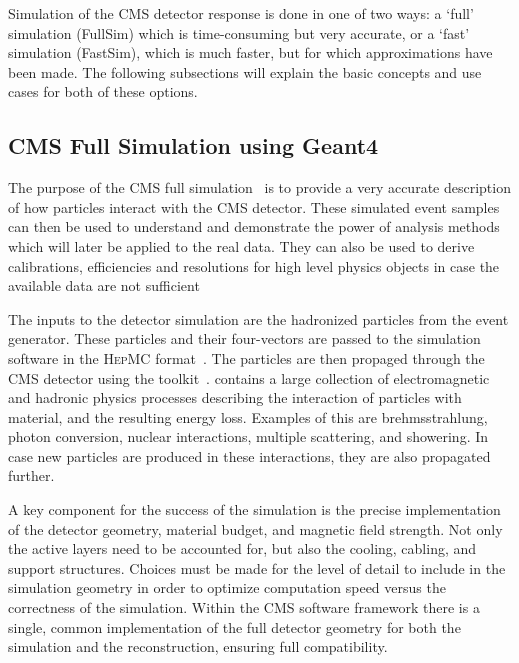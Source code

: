 
Simulation of the CMS detector response is done in one of two ways: a `full' simulation
(FullSim) which is time-consuming but very accurate, or a `fast' simulation (FastSim), which is much
faster, but for which approximations have been made. The following subsections will explain the
basic concepts and use cases for both of these options. 

\subsection{CMS Full Simulation using Geant4 \label{subsec:fullsim}}

The purpose of the CMS full simulation~\cite{Banerjee:2007zz,Banerjee:2011zzc,Banerjee:2012ge} is to
provide a very accurate description of how particles interact with the CMS detector. These simulated
event samples can then be used to understand and demonstrate the power of analysis methods which
will later be applied to the real data. They can also be used to derive calibrations, efficiencies
and resolutions for high level physics objects in case the available data are not sufficient

The inputs to the detector simulation are the hadronized particles from the event generator. These
particles and their four-vectors are passed to the simulation software in the \textsc{HepMC}
format~\cite{Dobbs:2001ck}. 
The particles are then propaged through the CMS detector using the \GEANTfour toolkit~\cite{G4}.
\GEANTfour contains a large collection of electromagnetic and hadronic physics processes describing
the interaction of particles with material, and the resulting energy loss. Examples of this are
brehmsstrahlung, photon conversion, nuclear interactions, multiple scattering, and showering. In
case new particles are produced in these interactions, they are also propagated further. 

A key component for the success of the simulation is the precise implementation of the detector
geometry, material budget, and magnetic field strength. Not only the active layers need to be
accounted for, but also the cooling, cabling, and support structures. 
Choices must be made for the level of detail to include in the simulation geometry in order to
optimize computation speed versus the correctness of the simulation.
Within the CMS software framework there is a single, common implementation of the full detector
geometry for both the simulation and the reconstruction, ensuring full compatibility.

